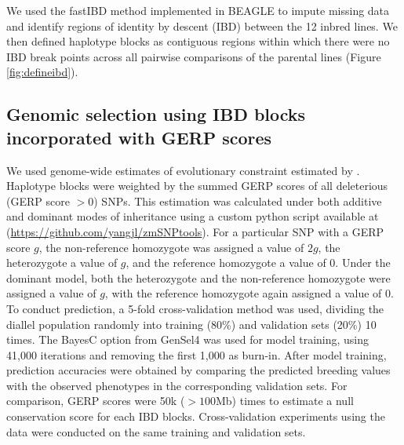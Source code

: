 \documentclass[9pt,twocolumn,twoside]{gsajnl}
\begin{document}
We used the fastIBD method implemented in BEAGLE \citep{Browning2009} to impute missing data and identify regions of identity by descent (IBD) between the 12 inbred lines. 
We then defined haplotype blocks as contiguous regions within which there were no IBD break points across all pairwise comparisons of the parental lines (Figure \ref{fig:defineibd}). \DIFaddbegin {}\DIFaddend 




\subsection*{Genomic selection using IBD blocks incorporated with GERP scores}

We used genome-wide estimates of evolutionary constraint \citep[GERP][]{Davydov2010} estimated by \citet{rodgers2015recombination}. 
Haplotype blocks were weighted by the summed GERP scores of all deleterious (GERP score $>0$) SNPs\DIFaddbegin {}\DIFaddend . 
This estimation was calculated under both additive and dominant modes of inheritance using a custom python script available at (\url{https://github.com/yangjl/zmSNPtools}). 
For a particular SNP with a GERP score $g$, the non-reference homozygote was assigned a value of $2g$, the heterozygote a value of $g$, and the reference homozygote a value of 0.  
Under the dominant model, both the heterozygote and the non-reference homozygote were assigned a value of $g$, with the reference homozygote again assigned a value of 0.
To conduct prediction, a 5-fold cross-validation method was used, dividing the diallel population  randomly  into training (80\%) and validation sets (20\%)  10 times. 
The BayesC option from GenSel4 \citep{habier2011extension} was used for model training, using 41,000 iterations and removing the first 1,000 as burn-in. 
\DIFdelbegin \DIFdelend After model training, prediction accuracies were obtained by comparing the predicted breeding values with the observed phenotypes in the corresponding validation sets. 
For comparison, GERP scores were \DIFdelbegin {}\DIFdelend \DIFaddbegin {}\DIFaddend 50k \DIFdelbegin {}\DIFdelend \DIFaddbegin {}\DIFaddend ($> 100$Mb) \DIFaddbegin {} times to estimate a null conservation score for each IBD blocks. 
Cross-validation experiments using the \DIFdelbegin {}\DIFdelend \DIFaddbegin {}\DIFaddend data were conducted on the same training and validation sets.  
\end{document}

